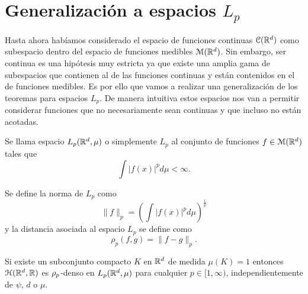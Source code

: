 %
\section{Generalización a espacios $L_p$}  
\label{ch04:espacios-Lp}
Hasta ahora habíamos considerado el espacio de funciones continuas 
$\mathcal{C}(\mathbb{R}^d)$ 
como subespacio dentro del espacio de funciones medibles $\mathcal{M}(\mathbb{R}^d)$. 
Sin embargo, ser continua es una hipótesis muy estricta ya que existe una amplia gama de subespacios que contienen al de 
las funciones continuas y están contenidos en el de funciones medibles. 
Es por ello que vamos a realizar una generalización de los teoremas
para espacios $L_p$. De manera intuitiva estos espacios nos van a 
permitir considerar funciones que no necesariamente sean continuas
y que incluso no están acotadas. 

 \normalmarginpar
\begin{definicion}[Espacios Lp]
    Se llama espacio $L_p(\mathbb{R}^d, \mu)$ o simplemente $L_p$ al conjunto 
    de funciones $f \in \mathcal{M}(\mathbb{R}^d)$ tales que 
    \begin{equation}
        \int |f(x)|^p d\mu < \infty. 
    \end{equation}

   
Se define la norma de $L_p$ como 
\begin{equation}
    \| f\|_p 
    =
    \left(\int |f(x)|^p d\mu \right)^\frac{1}{p}
\end{equation}
y la distancia asociada al espacio $L_p$ se define como 
\begin{equation}
    \rho_p(f,g) = \| f-g\|_p.
\end{equation}
\end{definicion}


\begin{corolario}\label{corolario:2_2_rrnn}
    Si existe un subconjunto compacto $K$ en $\mathbb{R}^d$ de medida
    $\mu(K) =1$ entonces $\mathcal{H}(\mathbb{R}^d,\mathbb{R})$ es $\rho_{p}$-denso en $L_p(\mathbb{R}^d, \mu)$
    para cualquier $p \in [1,\infty)$, independientemente de 
    $\psi$, $d$ o $\mu$.
\end{corolario}

